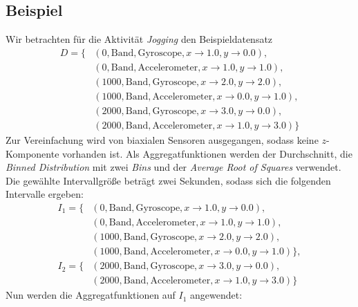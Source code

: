 \subsection{Beispiel}
Wir betrachten für die Aktivität \textit{Jogging} den Beispieldatensatz
\begin{align*}
D = \{&(0, \text{Band}, \text{Gyroscope}, {x \to 1.0, y \to 0.0}), \\
&(0, \text{Band}, \text{Accelerometer}, {x \to 1.0, y \to 1.0}), \\
&(1000, \text{Band}, \text{Gyroscope}, {x \to 2.0, y \to 2.0}), \\
&(1000, \text{Band}, \text{Accelerometer}, {x \to 0.0, y \to 1.0}), \\
&(2000, \text{Band}, \text{Gyroscope}, {x \to 3.0, y \to 0.0}), \\
&(2000, \text{Band}, \text{Accelerometer}, {x \to 1.0, y \to 3.0})\}
\end{align*} 
Zur Vereinfachung wird von biaxialen Sensoren ausgegangen, sodass keine $z$-Komponente vorhanden ist. Als Aggregatfunktionen werden der Durchschnitt, die \textit{Binned Distribution} mit zwei \textit{Bins} und der \textit{Average Root of Squares} verwendet. Die gewählte Intervallgröße beträgt zwei Sekunden, sodass sich die folgenden Intervalle ergeben:
\begin{align*}
I_1 = \{&(0, \text{Band}, \text{Gyroscope}, {x \to 1.0, y \to 0.0}), \\
&(0, \text{Band}, \text{Accelerometer}, {x \to 1.0, y \to 1.0}), \\
&(1000, \text{Band}, \text{Gyroscope}, {x \to 2.0, y \to 2.0}), \\
&(1000, \text{Band}, \text{Accelerometer}, {x \to 0.0, y \to 1.0})\}, \\
I_2 = \{&(2000, \text{Band}, \text{Gyroscope}, {x \to 3.0, y \to 0.0}), \\
&(2000, \text{Band}, \text{Accelerometer}, {x \to 1.0, y \to 3.0})\}
\end{align*}
Nun werden die Aggregatfunktionen auf $I_1$ angewendet:
